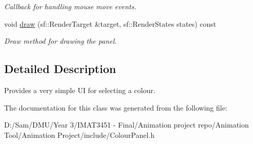 \begin{DoxyCompactItemize}
\begin{DoxyCompactList}\small\item\em Callback for handling mouse move events. \end{DoxyCompactList}\item 
\mbox{\label{class_colour_panel_a9a763ee1e08cee05d93e95a7c0e87ca5}} 
void \hyperlink{class_colour_panel_a9a763ee1e08cee05d93e95a7c0e87ca5}{draw} (sf\+::\+Render\+Target \&target, sf\+::\+Render\+States states) const
\begin{DoxyCompactList}\small\item\em Draw method for drawing the panel. \end{DoxyCompactList}\end{DoxyCompactItemize}


\subsection{Detailed Description}
Provides a very simple UI for selecting a colour. 

The documentation for this class was generated from the following file\+:\begin{DoxyCompactItemize}
\item 
D\+:/\+Sam/\+D\+M\+U/\+Year 3/\+I\+M\+A\+T3451 -\/ Final/\+Animation project repo/\+Animation Tool/\+Animation Project/include/Colour\+Panel.\+h\end{DoxyCompactItemize}
